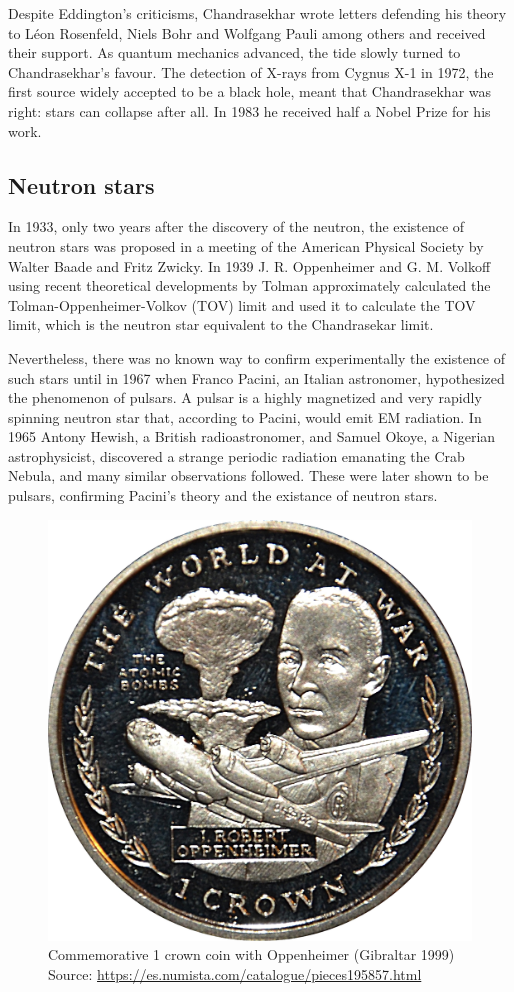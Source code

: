 \documentclass[a4paper]{article}
\begin{document}
Despite Eddington's criticisms, Chandrasekhar wrote letters defending his theory to Léon Rosenfeld, Niels Bohr and Wolfgang Pauli among others and received their support. As quantum mechanics advanced, the tide slowly turned to Chandrasekhar's favour. The detection of X-rays from Cygnus X-1 in 1972, the first source widely accepted to be a black hole, meant that Chandrasekhar was right: stars can collapse after all. In 1983 he received half a Nobel Prize for his work.

\subsection{Neutron stars}
In 1933, only two years after the discovery of the neutron, the existence of neutron stars was proposed in a meeting of the American Physical Society by Walter Baade and Fritz Zwicky. In 1939  J. R. Oppenheimer and G. M. Volkoff using recent theoretical developments by Tolman approximately calculated the Tolman-Oppenheimer-Volkov (TOV) limit \cite{oppenheimerMassiveNeutronCores1939} and used it to calculate the TOV limit, which is the neutron star equivalent to the Chandrasekar limit.

Nevertheless, there was no known way to confirm experimentally the existence of such stars until in 1967 when Franco Pacini, an Italian astronomer, hypothesized the phenomenon of pulsars. A pulsar is a highly magnetized and very rapidly spinning neutron star that, according to Pacini, would emit EM radiation. In 1965 Antony Hewish, a British radioastronomer, and Samuel Okoye, a Nigerian astrophysicist, discovered a strange periodic radiation emanating the Crab Nebula, and many similar observations followed. These were later shown to be pulsars, confirming Pacini's theory and the existance of neutron stars. 

\begin{figure}
    \centering
    \includegraphics[width=0.3\linewidth]{images/Oppenheimer_coin.jpg}
    \caption{\centering Commemorative 1 crown coin with Oppenheimer (Gibraltar 1999)\\ Source: \url{https://es.numista.com/catalogue/pieces195857.html}}
    \label{fig:oppenheimercoin}
\end{figure}
\end{document}

